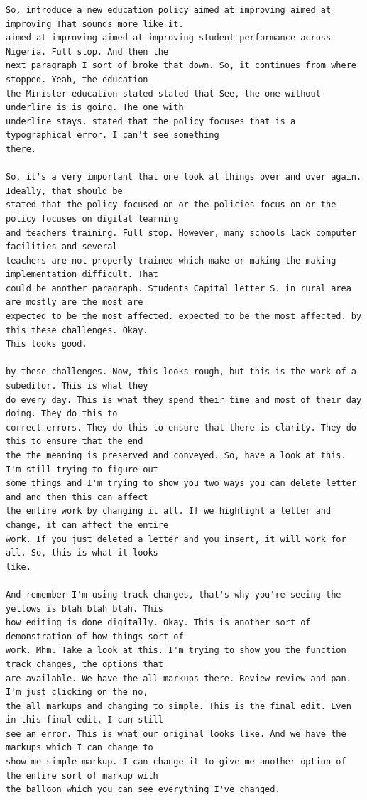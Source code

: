 {\begin{Verbatim}
So, introduce a new education policy aimed at improving aimed at improving That sounds more like it.
aimed at improving aimed at improving student performance across Nigeria. Full stop. And then the
next paragraph I sort of broke that down. So, it continues from where stopped. Yeah, the education
the Minister education stated stated that See, the one without underline is is going. The one with
underline stays. stated that the policy focuses that is a typographical error. I can't see something
there.

So, it's a very important that one look at things over and over again. Ideally, that should be
stated that the policy focused on or the policies focus on or the policy focuses on digital learning
and teachers training. Full stop. However, many schools lack computer facilities and several
teachers are not properly trained which make or making the making implementation difficult. That
could be another paragraph. Students Capital letter S. in rural area are mostly are the most are
expected to be the most affected. expected to be the most affected. by this these challenges. Okay.
This looks good.

by these challenges. Now, this looks rough, but this is the work of a subeditor. This is what they
do every day. This is what they spend their time and most of their day doing. They do this to
correct errors. They do this to ensure that there is clarity. They do this to ensure that the end
the the meaning is preserved and conveyed. So, have a look at this. I'm still trying to figure out
some things and I'm trying to show you two ways you can delete letter and and then this can affect
the entire work by changing it all. If we highlight a letter and change, it can affect the entire
work. If you just deleted a letter and you insert, it will work for all. So, this is what it looks
like.

And remember I'm using track changes, that's why you're seeing the yellows is blah blah blah. This
how editing is done digitally. Okay. This is another sort of demonstration of how things sort of
work. Mhm. Take a look at this. I'm trying to show you the function track changes, the options that
are available. We have the all markups there. Review review and pan. I'm just clicking on the no,
the all markups and changing to simple. This is the final edit. Even in this final edit, I can still
see an error. This is what our original looks like. And we have the markups which I can change to
show me simple markup. I can change it to give me another option of the entire sort of markup with
the balloon which you can see everything I've changed.


\end{Verbatim}}
